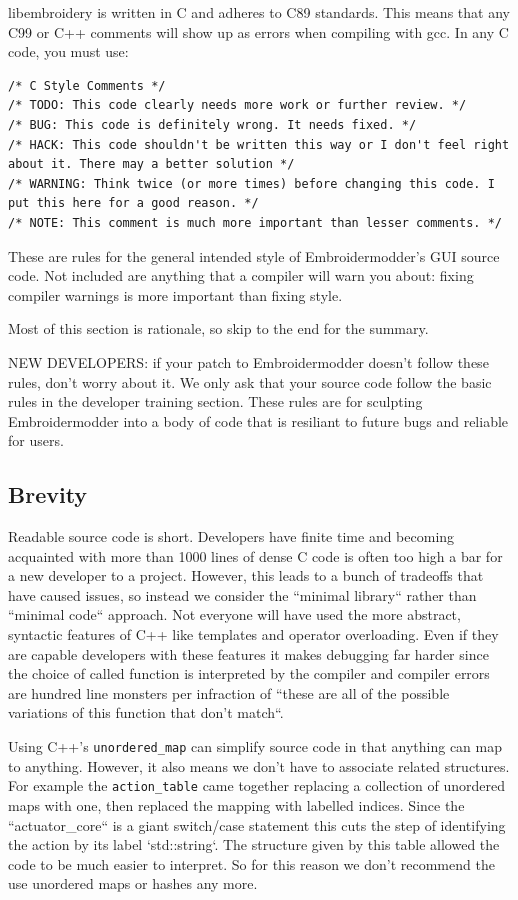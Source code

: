 \documentclass[a4paper]{report}
\begin{document}
libembroidery is written in C and adheres to C89 standards. This means
that any C99 or C++ comments will show up as errors when compiling with
gcc. In any C code, you must use:

\begin{lstlisting}
/* C Style Comments */
/* TODO: This code clearly needs more work or further review. */
/* BUG: This code is definitely wrong. It needs fixed. */
/* HACK: This code shouldn't be written this way or I don't feel right about it. There may a better solution */
/* WARNING: Think twice (or more times) before changing this code. I put this here for a good reason. */
/* NOTE: This comment is much more important than lesser comments. */
\end{lstlisting}

These are rules for the general intended style of Embroidermodder's GUI source
code. Not included are anything that a compiler will warn you about: fixing
compiler warnings is more important than fixing style.

Most of this section is rationale, so skip to the end for the summary.

NEW DEVELOPERS: if your patch to Embroidermodder doesn't follow these rules,
don't worry about it. We only ask that your source code follow the basic rules
in the developer training section. These rules are for sculpting Embroidermodder
into a body of code that is resiliant to future bugs and reliable for users.

\subsection{Brevity}

Readable source code is short. Developers have finite time and becoming
acquainted with more than 1000 lines of dense C code is often too high a bar
for a new developer to a project. However, this leads to a bunch of tradeoffs
that have caused issues, so instead we consider the ``minimal library``
rather than ``minimal code`` approach. Not everyone will have used the more
abstract, syntactic features of C++ like templates and operator overloading.
Even if they are capable developers with these features it makes debugging far
harder since the choice of called function is interpreted by the compiler and compiler
errors are hundred line monsters per infraction of ``these are all of the possible
variations of this function that don't match``.

Using C++'s \texttt{unordered\_map} can simplify source code in that anything can
map to anything. However, it also means we don't have to associate related structures.
For example the \texttt{action\_table} came together replacing a collection of unordered maps
with one, then replaced the mapping with labelled indices. Since the ``actuator\_core``
is a giant switch/case statement this cuts the step of identifying the action by its
label `std::string`.
The structure given by this table allowed the code to be much
easier to interpret. So for this reason we don't recommend the use unordered maps or hashes any more.
\end{document}
